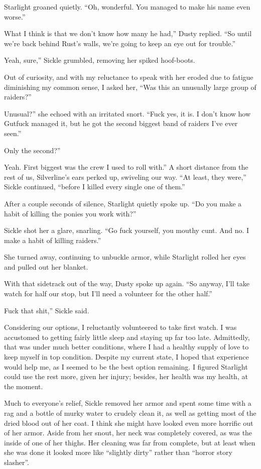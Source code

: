 Starlight groaned quietly. “Oh, wonderful. You managed to make his name even worse.”

\leavevmode{}What I think is that we don’t know how many he had,” Dusty replied. “So until we’re back behind Rust’s walls, we’re going to keep an eye out for trouble.”

\leavevmode{}Yeah, sure,” Sickle grumbled, removing her spiked hoof-boots.

Out of curiosity, and with my reluctance to speak with her eroded due to fatigue diminishing my common sense, I asked her, “Was this an unusually large group of raiders?”

\leavevmode{}Unusual?” she echoed with an irritated snort. “Fuck yes, it is. I don’t know how Gutfuck managed it, but he got the second biggest band of raiders I’ve ever seen.”

\leavevmode{}Only the second?”

\leavevmode{}Yeah. First biggest was the crew I used to roll with.” A short distance from the rest of us, Silverline’s ears perked up, swiveling our way. “At least, they were,” Sickle continued, “before I killed every single one of them.”

After a couple seconds of silence, Starlight quietly spoke up. “Do you make a habit of killing the ponies you work with?”

Sickle shot her a glare, snarling. “Go fuck yourself, you mouthy cunt. And no. I make a habit of killing raiders.”

She turned away, continuing to unbuckle armor, while Starlight rolled her eyes and pulled out her blanket.

With that sidetrack out of the way, Dusty spoke up again. “So anyway, I’ll take watch for half our stop, but I’ll need a volunteer for the other half.”

\leavevmode{}Fuck that shit,” Sickle said.

Considering our options, I reluctantly volunteered to take first watch. I was accustomed to getting fairly little sleep and staying up far too late. Admittedly, that was under much better conditions, where I had a healthy supply of love to keep myself in top condition. Despite my current state, I hoped that experience would help me, as I seemed to be the best option remaining. I figured Starlight could use the rest more, given her injury; besides, her health was my health, at the moment.

Much to everyone’s relief, Sickle removed her armor and spent some time with a rag and a bottle of murky water to crudely clean it, as well as getting most of the dried blood out of her coat. I think she might have looked even more horrific out of her armor. Aside from her snout, her neck was completely covered, as was the inside of one of her thighs. Her cleaning was far from complete, but at least when she was done it looked more like “slightly dirty” rather than “horror story slasher”.

